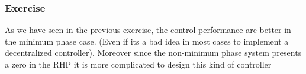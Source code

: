 \subsubsection{Exercise}

As we have seen in the previous exercise, the control performance are better in the minimum phase case. 
(Even if its a bad idea in most cases to implement a decentralized controller).
Moreover since the non-minimum phase system presents a zero in the RHP it is more complicated to design this kind of controller 
